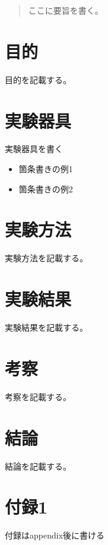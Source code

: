 \documentclass[titlepage]{jlreq}
\begin{document}
\begin{abstract}

ここに要旨を書く。

\end{abstract} 


\section{目的}

目的を記載する。

\section{実験器具}

実験器具を書く

\begin{itemize}
    \item 箇条書きの例1
    \item 箇条書きの例2
\end{itemize}

\section{実験方法}

実験方法を記載する。

\section{実験結果}

実験結果を記載する。

\section{考察}

考察を記載する。


\section{結論}

結論を記載する。






\appendix

\section{付録1}

付録はappendix後に書ける
\end{document}
